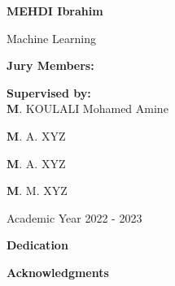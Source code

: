 \documentclass[a4paper,12pt,twoside]{report}
\begin{document}
\begin{titlepage}
\vfill

\begin{center}
    \textbf{MEHDI Ibrahim}

\end{center}

\vfill

\begin{center}
    \hrulefill\par
    \LARGE Machine Learning\par
    \hrulefill\par
\end{center}

\vfill

\textbf{Jury Members:}\hfill\parbox[t]{4cm}{\textbf{Supervised by:\\}\textbf{M}. KOULALI Mohamed Amine}\par
\textbf{M}. A. XYZ\par
\textbf{M}. A. XYZ\par
\textbf{M}. M. XYZ\par

\vfill

\begin{center}
    Academic Year 2022 - 2023
\end{center}

\end{titlepage}

\newpage
\thispagestyle{empty}
\begin{center}
    \Large\textbf{Dedication}
\end{center}

\newpage
\thispagestyle{empty}
\begin{center}
    \Large\textbf{Acknowledgments}
\end{center}

\newpage

\begin{abstract}

\end{abstract}

\newpage
{}
\begin{abstract}

\end{abstract}

\newpage


\tableofcontents{}

\thispagestyle{empty}
\end{document}
